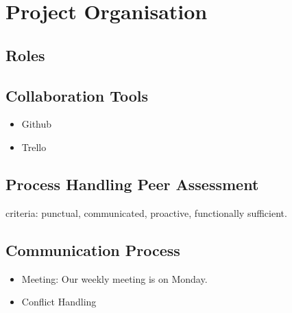 \documentclass[11pt]{article}
\begin{document}
\newpage
\section{Project Organisation}
\subsection{Roles}
\subsection{Collaboration Tools}
\begin{itemize}
	\item Github
	\item Trello
\end{itemize}
\subsection{Process Handling Peer Assessment}
criteria: punctual, communicated, proactive, functionally sufficient. 
\subsection{Communication Process}
\begin{itemize}
	\item Meeting: Our weekly meeting is on Monday.
	\item Conflict Handling
\end{itemize}
\end{document}
